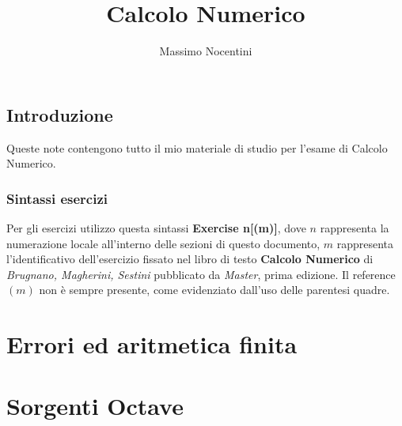 \documentclass[11pt, a4paper]{report}
\title{Calcolo Numerico}
\author{Massimo Nocentini}
\begin{document}
\lstset{
	language = octave
	, numbers = left 
	, basicstyle=\footnotesize
	, frame=single
	, tabsize=2
	, captionpos=b
	, breaklines=true
	, showspaces=false
	, showstringspaces=false
}

\maketitle

\tableofcontents

\newpage

\section*{Introduzione}
Queste note contengono tutto il mio materiale di studio per l'esame di Calcolo Numerico.

\subsection*{Sintassi esercizi}
Per gli esercizi utilizzo questa sintassi \textbf{Exercise n[(m)]}, dove $n$
rappresenta la numerazione locale all'interno delle sezioni di questo documento, 
$m$ rappresenta l'identificativo dell'esercizio fissato nel libro di testo 
\textbf{Calcolo Numerico} di \emph{Brugnano, Magherini, Sestini} pubblicato da \emph{Master}, 
prima edizione.
Il reference $(m)$ non \`e sempre presente, come evidenziato dall'uso delle parentesi quadre.

\chapter{Errori ed aritmetica finita}





\chapter{Sorgenti Octave}



\end{document}
